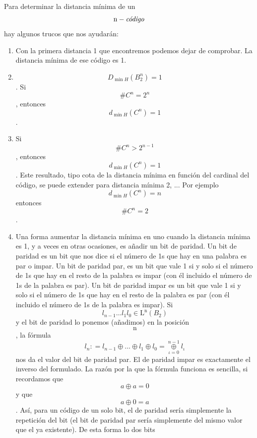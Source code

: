 \begin{enumerate}
\begin{enumerate}
\begin{enumerate}
      Para determinar la distancia mínima de un
      \[\mathtt{\mathrm{n}} - \text{\textit{código}}\]hay algunos trucos que
      nos ayudarán:

      \begin{enumerate}
      \def\labelenumiv{\arabic{enumiv}.}
      \item
        Con la primera distancia 1 que encontremos podemos dejar de
        comprobar. La distancia mínima de ese código es 1.
      \item
        \[D_{\min H}{\left( B_{2}^{n} \right) = 1}\].
        Si\[\#{C^{n} = 2^{n}}\], entonces
        \[d_{\min H}{\left( C^{n} \right) = 1}\].
      \item
        Si\[\#{C^{n} > 2^{n - 1}}\],
        entonces\[d_{\min H}{\left( C^{n} \right) = 1}\]. Este
        resultado, tipo cota de la dis\-tancia mínima en función del
        cardinal del código, se puede extender para distancia mínima 2,
        ... Por
        ejemplo\[d_{\min H}{\left( C^{n} \right) = n}\]entonces\[{\# C^{n}} = 2\].
      \item
        Una forma aumentar la distancia mínima en uno cuando la
        distancia mínima es 1, y a veces en otras ocasiones, es añadir
        un bit de paridad. Un bit de paridad es un bit que nos dice si
        el número de 1s que hay en una palabra es par o impar. Un bit de
        paridad par, es un bit que vale 1 si y solo si el número de 1s
        que hay en el resto de la palabra es impar (con él incluido el
        número de 1s de la palabra es par). Un bit de paridad impar es
        un bit que vale 1 si y solo si el número de 1s que hay en el
        resto de la palabra es par (con él incluido el número de 1s de
        la palabra es impar). Si
        \[{l_{n - 1}\ldots l_{1}l_{0}} \in {\mathtt{\mathrm{L}}^{\mathtt{\mathrm{n}}}\left( B_{2} \right)}\]y
        el bit de paridad lo ponemos (añadimos) en la posición
        \[\mathtt{\mathrm{n}}\], la fórmula
        \[l_{n}{: = l_{n - 1}} \oplus \ldots \oplus l_{1} \oplus {l_{0} = \underset{\iota = 0}{\overset{n - 1}{\oplus}}}l_{\iota}\]
        nos da el valor del bit de paridad par. El de paridad impar es
        exactamente el inverso del formulado. La ra\-zón por la que la
        fórmula funciona es sencilla, si recordamos que
        \[a \oplus {a = 0}\] y que \[a \oplus {0 = a}\]. Así, para un
        código de un solo bit, el de paridad sería simple\-mente la
        repetición del bit (el bit de paridad par sería simplemente del
        mismo va\-lor que el ya existente). De esta forma lo dos bits

\end{enumerate}
\end{enumerate}
\end{enumerate}
\end{enumerate}
